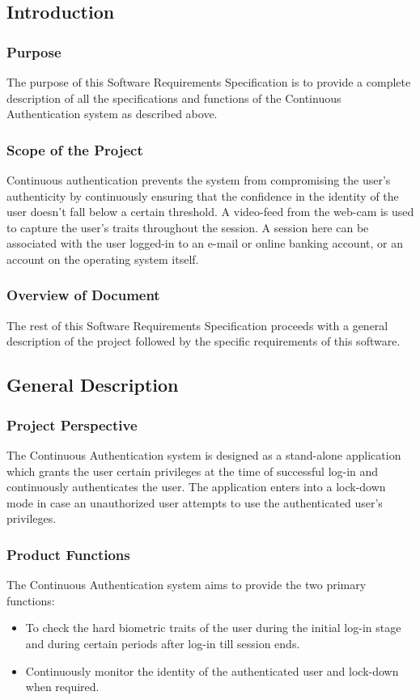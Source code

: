 \documentclass[12pt]{article}			%
\begin{document}
\subsection{ Introduction }

\subsubsection{ Purpose }
The purpose of this Software Requirements Specification is to provide a complete description of all the specifications and functions of the Continuous Authentication system as described above.

\subsubsection{ Scope of the Project }
Continuous authentication prevents the system from compromising the user's authenticity by continuously ensuring that the confidence in the identity of the user doesn't fall below a certain threshold. A video-feed from the web-cam is used to capture the user's traits throughout the session. A session here can be associated with the user logged-in to an e-mail or online banking account, or an account on the operating system itself.

\subsubsection{ Overview of Document }
The rest of this Software Requirements Specification proceeds with a general description of the project followed by the specific requirements of this software. 

\subsection{ General Description }
\subsubsection{ Project Perspective }
The Continuous Authentication system is designed as a stand-alone application which grants the user certain privileges at the time of successful log-in and continuously authenticates the user. The application enters into a lock-down mode in case an unauthorized  user attempts to use the authenticated user's privileges. 

\subsubsection{ Product Functions }
The Continuous Authentication system aims to provide the two primary functions:
\begin{itemize}
	\item To check the hard biometric traits of the user during the initial log-in stage and during certain periods after log-in till session ends.
	\item Continuously monitor the identity of the authenticated user and lock-down when required.
\end{itemize}
\end{document}
